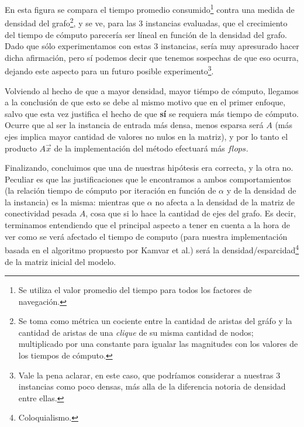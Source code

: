 \par En esta figura se compara el tiempo promedio consumido\footnote{Se utiliza
el valor promedio del tiempo para todos los factores de navegación.} contra una
medida de densidad del grafo\footnote{Se toma como métrica un cociente entre la
cantidad de aristas del gráfo y la cantidad de aristas de una \emph{clique} de
su misma cantidad de nodos; multiplicado por una constante para igualar las
magnitudes con los valores de los tiempos de c\'omputo.}, y se ve, para las 3
instancias evaluadas, que el crecimiento del tiempo de c\'omputo parecer\'ia ser
l\'ineal en funci\'on de la densidad del grafo. Dado que s\'olo experimentamos
con estas 3 instancias, ser\'ia muy apresurado hacer dicha afirmaci\'on, pero sí
podemos decir que tenemos sospechas de que eso ocurra, dejando este aspecto para
un futuro posible experimento\footnote{Vale la pena aclarar, en este caso, que
podr\'iamos considerar a nuestras 3 instancias como poco densas, m\'as alla de
la diferencia notoria de densidad entre ellas.}.

\par Volviendo al hecho de que a mayor densidad, mayor ti\'empo de c\'omputo,
llegamos a la conclusi\'on de que esto se debe al mismo motivo que en el primer
enfoque, salvo que esta vez justifica el hecho de que \textbf{s\'i} se requiera
m\'as tiempo de c\'omputo. Ocurre que al ser la instancia de entrada m\'as
densa, menos esparsa ser\'a $A$ (m\'as ejes implica mayor cantidad de valores no
nulos en la matriz), y por lo tanto el producto $A\vec{x}$ de la
implementaci\'on del m\'etodo efectuar\'a m\'as $flops$.

\medskip
\par Finalizando, concluimos que una de nuestras hip\'otesis era correcta, y la
otra no. Peculiar es que las justificaciones que le encontramos a ambos
comportamientos (la relaci\'on tiempo de c\'omputo por iteraci\'on en funci\'on
de $\alpha$ y de la densidad de la instancia) es la misma: mientras que $\alpha$
no afecta a la densidad de la matriz de conectividad pesada $A$, cosa que si lo
hace la cantidad de ejes del grafo. Es decir, terminamos entendiendo que el
principal aspecto a tener en cuenta a la hora de ver como se ver\'a afectado el
tiempo de computo (para nuestra implementaci\'on basada en el algoritmo
propuesto por Kamvar et al.\cite{Kamvar2003}) ser\'a la
densidad/esparcidad\footnote{Coloquialismo.} de la matriz inicial del modelo.
